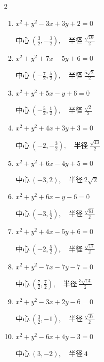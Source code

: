 \begin{multicols}{2}
\begin{enumerate}
        $\displaystyle 中心\: \left(-3,2\right), \quad 半径 \ \sqrt{15}$

  \item $x^{2}+y^{2}-3x+3y+2=0$

        $\displaystyle 中心\: \left(\frac{3}{2},-\frac{3}{2}\right), \quad 半径 \ \frac{\sqrt{10}}{2}$

  \item $x^{2}+y^{2}+7x-5y+6=0$

        $\displaystyle 中心\: \left(-\frac{7}{2},\frac{5}{2}\right), \quad 半径 \ \frac{5\sqrt{2}}{2}$

  \item $x^{2}+y^{2}+5x-y+6=0$

        $\displaystyle 中心\: \left(-\frac{5}{2},\frac{1}{2}\right), \quad 半径 \ \frac{\sqrt{2}}{2}$

\columnbreak %

\resetques

  \item $x^{2}+y^{2}+4x+3y+3=0$

        $\displaystyle 中心\: \left(-2,-\frac{3}{2}\right), \quad 半径 \ \frac{\sqrt{13}}{2}$

  \item $x^{2}+y^{2}+6x-4y+5=0$

        $\displaystyle 中心\: \left(-3,2\right), \quad 半径 \ 2\sqrt{2}$

  \item $x^{2}+y^{2}+6x-y-6=0$

        $\displaystyle 中心\: \left(-3,\frac{1}{2}\right), \quad 半径 \ \frac{\sqrt{61}}{2}$

  \item $x^{2}+y^{2}+4x-5y+6=0$

        $\displaystyle 中心\: \left(-2,\frac{5}{2}\right), \quad 半径 \ \frac{\sqrt{17}}{2}$

  \item $x^{2}+y^{2}-7x-7y-7=0$

        $\displaystyle 中心\: \left(\frac{7}{2},\frac{7}{2}\right), \quad 半径 \ \frac{3\sqrt{14}}{2}$

  \item $x^{2}+y^{2}-3x+2y-6=0$

        $\displaystyle 中心\: \left(\frac{3}{2},-1\right), \quad 半径 \ \frac{\sqrt{37}}{2}$

  \item $x^{2}+y^{2}-6x+4y-3=0$

        $\displaystyle 中心\: \left(3,-2\right), \quad 半径 \ 4$


\end{enumerate}
\end{multicols}
